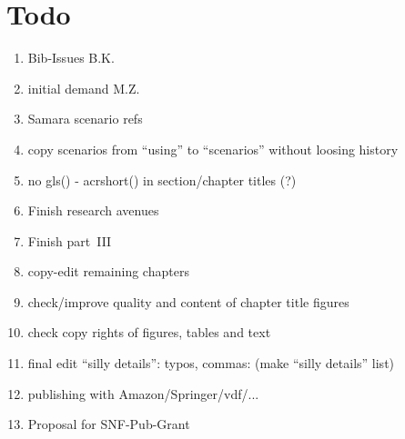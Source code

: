\section*{Todo}

\begin{enumerate}\styleEnumerate

\item Bib-Issues B.K.

\item initial demand M.Z.

\item Samara scenario refs

\item copy scenarios from ``using'' to ``scenarios'' without loosing history

\item no gls() - acrshort() in section/chapter titles (?)

\item Finish research avenues

\item Finish part~III

\item copy-edit remaining chapters

\item check/improve quality and content of chapter title figures

\item check copy rights of figures, tables and text

\item final edit ``silly details'': typos, commas: (make ``silly details'' list)

\item publishing with Amazon/Springer/vdf/...

\item Proposal for SNF-Pub-Grant






\end{enumerate}
